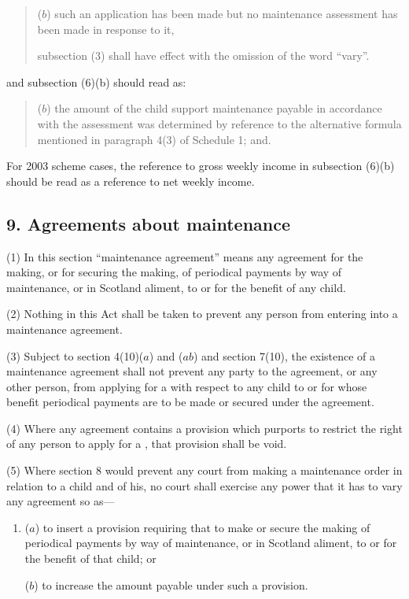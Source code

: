 \documentclass[12pt,a4paper]{article}
\begin{document}
{\begin{quotation}
\begin{enumerate}
($b$)
such an application has been made but no maintenance assessment has been
made in response to it,
\end{enumerate}
subsection (3) shall have effect with the omission of the word “vary”.
\end{quotation}
and subsection (6)(b) should read as:
\begin{quotation}
($b$)
the amount of the child support maintenance payable in accordance with
the assessment was determined by reference to the alternative formula
mentioned in paragraph 4(3) of Schedule 1; and.
\end{quotation}

For 2003 scheme cases, the reference to gross weekly income in subsection (6)(b) should be read as a reference to net weekly income.
}

\subsection{9. Agreements about maintenance}

(1) In
this section “maintenance agreement” means any agreement for the
making, or for securing the making, of periodical payments by way of maintenance, or in Scotland aliment, to or for the benefit of any child.

(2) Nothing in this Act shall be taken to prevent any person from entering into
a maintenance agreement.

(3) Subject to section 4(10)($a$) and ($ab$) and section 7(10), the existence of a
maintenance agreement shall not prevent any party to the agreement, or any other
person, from applying for a 
with
respect to any child to or for whose benefit periodical payments are to be made or
secured under the agreement.

(4) Where any agreement contains a provision which purports to restrict the
right of any person to apply for a ,
that provision shall be void.

(5) Where section 8 would prevent any court from making a maintenance order
in relation to a child and 
of his, no court
shall exercise any power that it has to vary any agreement so as---
\begin{enumerate}\item[]
($a$) to insert a provision requiring that 
to
make or secure the making of periodical payments by way of maintenance,
or in Scotland aliment, to or for the benefit of that child; or

($b$)
to increase the amount payable under such a provision.
\end{enumerate}
\end{document}
